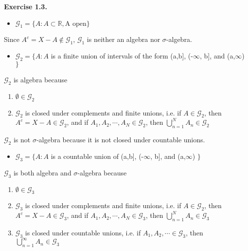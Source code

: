 \documentclass[letterpaper,12pt]{article}
\theoremstyle{definition}
\begin{document}
	
	\begin{spacing}{1.3}{}
		\vspace{2 mm}


\textbf{Exercise 1.3.}

\begin{itemize}
\item $\mathcal{G}_{1} = \{A : A \subset \mathbb{R}, \text{A open}\}$
\end{itemize}

Since $A^{c} = X - A \notin \mathcal{G}_{1}$, $\mathcal{G}_{1}$ is neither an algebra nor $\sigma$-algebra.

\begin{itemize}
\item $\mathcal{G}_2 = \{A: A $ is a finite union of intervals of the form (a,b], (-$\infty$, b], and (a,$\infty$) $\}$
\end{itemize}

$\mathcal{G}_2$ is algebra because 

\begin{enumerate}
\item $\emptyset \in \mathcal{G}_2$
\item $\mathcal{G}_2$ is closed under complements and finite unions, i.e. if $A \in  \mathcal{G}_2$, then $A^c = X-A \in  \mathcal{G}_2$, and if $A_1, A_2, \cdots, A_N \in  \mathcal{G}_2$, then $\bigcup_{n=1}^{N} A_n \in  \mathcal{G}_2$
\end{enumerate}

$\mathcal{G}_2$ is not $\sigma$-algebra because it is not closed under countable unions.

\begin{itemize}
\item $\mathcal{G}_3 = \{A: A $ is a countable union of (a,b], (-$\infty$, b], and (a,$\infty$) $\}$
\end{itemize}

$\mathcal{G}_3$ is both algebra and $\sigma$-algebra because 

\begin{enumerate}
\item $\emptyset \in \mathcal{G}_3$
\item $\mathcal{G}_3$ is closed under complements and finite unions, i.e. if $A \in  \mathcal{G}_2$, then $A^c = X-A \in  \mathcal{G}_3$, and if $A_1, A_2, \cdots, A_N \in  \mathcal{G}_3$, then $\bigcup_{n=1}^{N} A_n \in  \mathcal{G}_3$
\item $\mathcal{G}_3$ is closed under countable unions, i.e. if $A_1, A_2, \cdots \in \mathcal{G}_3$, then $\bigcup_{n=1}^{\infty} A_n \in \mathcal{G}_3$
\end{enumerate}


\end{spacing}
\end{document}
